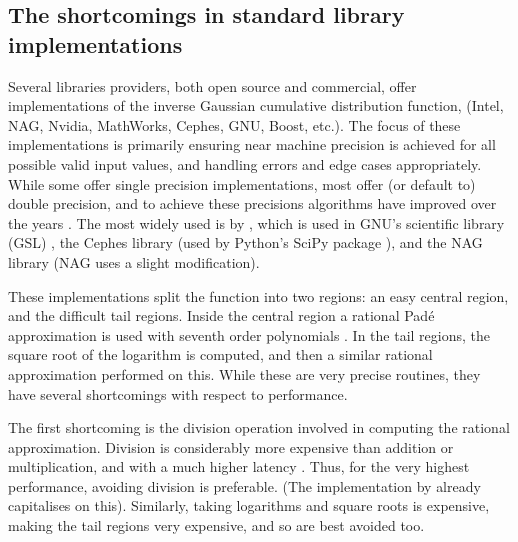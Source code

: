 \documentclass[manuscript,review]{acmart}
\begin{document}
\subsection{The shortcomings in standard library implementations}

Several libraries providers, both open source and commercial, offer implementations of the inverse Gaussian cumulative distribution function, (Intel, NAG, Nvidia, MathWorks, Cephes, GNU, Boost, etc.). The focus of these implementations is primarily ensuring near machine precision is achieved for all possible valid input values, and handling errors and edge cases appropriately. While some offer single precision implementations, most offer (or default to) double precision, and to achieve these precisions algorithms have improved over the years \citep{hastings1955approximations,evans1974algorithm70,beasley1985percentage,wichura1988algorithm,marsaglia1994rapid,giles2011approximating}. The most widely used is by \citet{wichura1988algorithm}, which is used in GNU's scientific library (GSL) \citep{galassi2017gsl}, the Cephes library \citep{moshier1992cephes} (used by Python's SciPy package \citep{scipy2020scipy}), and the NAG library \citep{nag2017mark26} (NAG uses a slight modification). 

These implementations split the function into two regions: an easy central region, and the difficult tail regions. Inside the central region a rational Pad\'{e} approximation is used with seventh order polynomials \citep{wichura1988algorithm}. In the tail regions, the square root of the logarithm is computed, and then a similar rational approximation performed on this. While these are very precise routines, they have several shortcomings with respect to performance.

The first shortcoming is the division operation involved in computing the rational approximation. Division is considerably more expensive than addition or multiplication, and with a much higher latency \citep{wittmann2015short,fog2018instruction}. Thus, for the very highest performance, avoiding division is preferable. (The implementation by \citet{giles2011approximating} already capitalises on this). Similarly, taking logarithms and square roots is expensive, making the tail regions very expensive, and so are best avoided too. 
\end{document}
